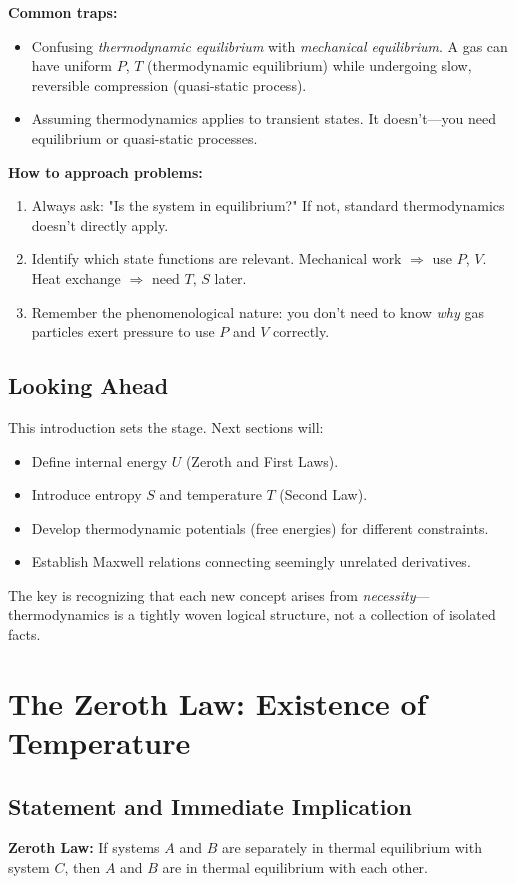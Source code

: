 \documentclass[9pt,twocoloumn]{article}
\begin{document}
\textbf{Common traps:}
\begin{itemize}
    \item Confusing \emph{thermodynamic equilibrium} with \emph{mechanical equilibrium}. A gas can have uniform $P$, $T$ (thermodynamic equilibrium) while undergoing slow, reversible compression (quasi-static process).
    \item Assuming thermodynamics applies to transient states. It doesn't—you need equilibrium or quasi-static processes.
\end{itemize}

\textbf{How to approach problems:}
\begin{enumerate}
    \item Always ask: "Is the system in equilibrium?" If not, standard thermodynamics doesn't directly apply.
    \item Identify which state functions are relevant. Mechanical work $\Rightarrow$ use $P$, $V$. Heat exchange $\Rightarrow$ need $T$, $S$ later.
    \item Remember the phenomenological nature: you don't need to know \emph{why} gas particles exert pressure to use $P$ and $V$ correctly.
\end{enumerate}

\subsection{Looking Ahead}
This introduction sets the stage. Next sections will:
\begin{itemize}
    \item Define internal energy $U$ (Zeroth and First Laws).
    \item Introduce entropy $S$ and temperature $T$ (Second Law).
    \item Develop thermodynamic potentials (free energies) for different constraints.
    \item Establish Maxwell relations connecting seemingly unrelated derivatives.
\end{itemize}

The key is recognizing that each new concept arises from \emph{necessity}—thermodynamics is a tightly woven logical structure, not a collection of isolated facts.
\section{The Zeroth Law: Existence of Temperature}

\subsection{Statement and Immediate Implication}
\textbf{Zeroth Law:} If systems $A$ and $B$ are separately in thermal equilibrium with system $C$, then $A$ and $B$ are in thermal equilibrium with each other.
\end{document}
